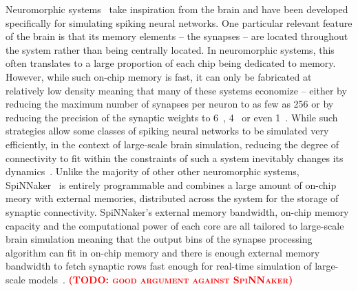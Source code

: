 \documentclass[9pt,twocolumn,twoside,lineno]{pnas-new}
\newcommand{\todo}[1]{\textbf{\textsc{\textcolor{red}{(TODO: #1)}}}}
\begin{document}
Neuromorphic systems~\citep{Frenkel2018,Frenkel2019,Furber2014,Merolla2014,Qiao2015,Schemmel2017} take inspiration from the brain and have been developed specifically for simulating spiking neural networks.
One particular relevant feature of the brain is that its memory elements -- the synapses -- are located throughout the system rather than being centrally located.
In neuromorphic systems, this often translates to a large proportion of each chip being dedicated to memory.
However, while such on-chip memory is fast, it can only be fabricated at relatively low density meaning that many of these systems economize -- either by reducing the maximum number of synapses per neuron to as few as \num{256} or by reducing the precision of the synaptic weights to \num{6}~\citep{Schemmel2017}, \num{4}~\citep{Frenkel2018} or even \SI{1}{\bit}~\citep{Merolla2014,Frenkel2019}.
While such strategies allow some classes of spiking neural networks to be simulated very efficiently, in the context of large-scale brain simulation, reducing the degree of connectivity to fit within the constraints of such a system inevitably changes its dynamics~\citep{VanAlbada2015}.
Unlike the majority of other other neuromorphic systems, SpiNNaker~\citep{Furber2014} is entirely programmable and combines a large amount of on-chip meory with external memories, distributed across the system for the storage of synaptic connectivity.
SpiNNaker's external memory bandwidth, on-chip memory capacity and the computational power of each core are all tailored to large-scale brain simulation meaning that the output bins of the synapse processing algorithm can fit in on-chip memory and there is enough external memory bandwidth to fetch synaptic rows fast enough for real-time simulation of large-scale models~\citep{Rhodes2019}.
\todo{good argument against SpiNNaker}
\end{document}
